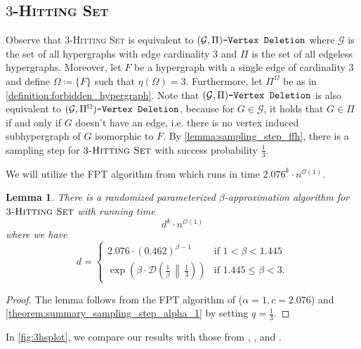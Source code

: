 \documentclass[letterpaper,11pt]{article}
\newcommand{\1}[1]{\mathds{1}\left[#1\right]}
\newcommand{\D}[2]{\mathcal{D}\left(#1\, \middle\|\,#2 \right)}
\newcommand{\Oh}{\mathcal{O}}
\newtheorem{lemma}[theorem]{Lemma}
\newcommand{\gpivd}[1][\mathcal{G},\Pi]{(#1)\textnormal{\texttt{-Vertex Deletion}}}
\newcommand{\hs}[1]{\ensuremath{#1}\textsc{-Hitting Set}\xspace}
\begin{document}
\subsection{\hs{3}}
Observe that \hs{3} is equivalent to $\gpivd$ where $\mathcal{G}$ is the set of
all hypergraphs with edge cardinality $3$ and $\Pi$ is the set of all edgeless
hypergraphs. Moreover, let $F$ be a hypergraph with a single edge of cardinality
3 and define $\Omega \coloneqq \{F\}$ such that $\eta\left( \Omega \right) = 3$. Furthermore, 
let $\Pi^{\Omega}$ be as in \cref{definition:forbidden_hypergraph}.
Note that $\gpivd$ is also equivalent to $\gpivd[\mathcal{G}, \Pi^{\Omega}]$, because for $G \in \mathcal{G}$,
it holds that $G \in \Pi$ if and only if $G$ doesn't have an edge, i.e. there is no vertex induced
subhypergraph of $G$ isomorphic to $F$.
By \cref{lemma:sampling_step_ffh}, there is
a sampling step for $\hs{3}$ with success probability $\frac{1}{3}$.

We will utilize the FPT algorithm from \cite{wahlstromAlgorithmsMeasuresUpper2007}
which runs in time $2.076^{k} \cdot n^{\Oh(1)}$.
\begin{lemma}
	There is a randomized parameterized $\beta$-approximation algorithm
	for $\hs{3}$ with running time
	\begin{equation*}
		d^{k} \cdot n^{\Oh(1)}
	\end{equation*}
	where we have	
	\begin{equation}\label{eq:alpha_1_eq}
		d = \begin{cases}
			2.076 \cdot \left(0.462\right)^{\beta - 1} &\text{if } 1 < \beta < 1.445\\
			\exp\left( \beta \cdot \D{\frac{1}{\beta}}{\frac{1}{3}} \right) &\text{if } 1.445 \leq \beta < 3.
		\end{cases}
	\end{equation}	
\end{lemma}

\begin{proof}
	The lemma follows from the FPT algorithm of \cite{wahlstromAlgorithmsMeasuresUpper2007} ($\alpha = 1, c = 2.076$) and \cref{theorem:summary_sampling_step_alpha_1} by setting $q = \frac{1}{3}$.
\end{proof}

In \cref{fig:3hsplot}, we compare our results with those from \cite{brankovicParameterizedApproximationAlgorithms2012}, \cite{Fellows2018}, and \cite{KulikS2020}.
\end{document}
